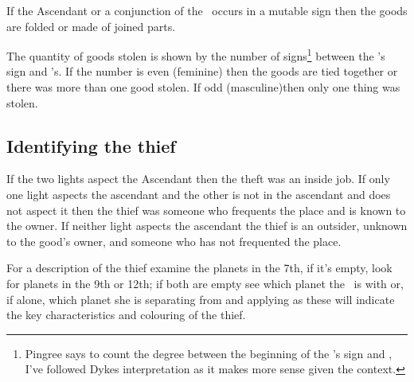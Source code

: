 If the Ascendant or a conjunction of the \Moon\, occurs in a mutable sign then the goods are folded or made of joined parts.

The quantity of goods stolen is shown by the number of signs\footnote{Pingree says to count the degree between the beginning of the \Moon's sign and \Mercury, I've followed Dykes interpretation as it makes more sense given the context.} between the \Moon's sign and  \Mercury's.  If the number is even (feminine) then the goods are tied together or there was more than one good stolen. If odd (masculine)then only one thing was stolen.

\subsection{Identifying the thief}
If the two lights aspect the Ascendant then the theft was an inside job.  If only one light aspects the ascendant and the other is not in the ascendant and does not aspect it then the thief was someone  who frequents the place and is known to the owner. If neither light aspects the ascendant the thief is an outsider, unknown to the good's owner, and someone who has not frequented the place.

For a description of the thief examine the planets in the 7th, if it's empty, look for planets in the 9th or 12th; if both are empty see which planet the \Moon\, is with or, if alone, which planet she is separating from and applying as these will indicate the key characteristics and colouring of the thief.

